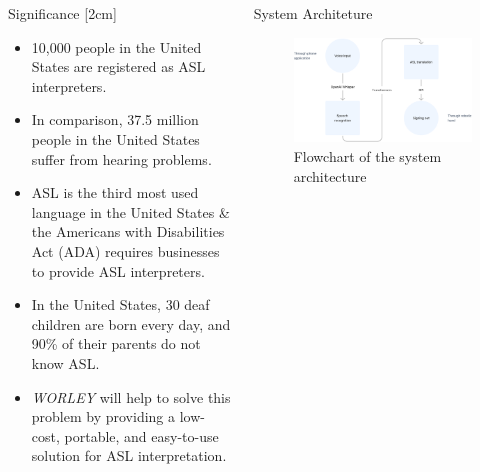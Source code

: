 \documentclass[final, 20pt]{beamer}
\newlength{\colwidth}
\begin{document}
\begin{frame}[t]
\begin{columns}[t]
\begin{column}{\colwidth}
\begin{block}{Significance}
        [2cm]

        \begin{itemize}
          \item 10,000 people in the United States are registered as ASL interpreters.
          \item In comparison, 37.5 million people in the United States suffer from hearing problems.
          \item ASL is the third most used language in the United States \& the Americans with Disabilities Act (ADA) requires businesses to provide ASL interpreters.
          \item In the United States, 30 deaf children are born every day, and 90\% of their parents do not know ASL.
          \item \emph{WORLEY} will help to solve this problem by providing a low-cost, portable, and easy-to-use solution for ASL interpretation.
        \end{itemize}
      \end{block}
    \end{column}

    \separatorcolumn

    \begin{column}{\colwidth}
      \begin{block}{System Architeture}
        \begin{figure}[ht]
          \centering
          \includegraphics[width=0.8\linewidth]{images/flowchart.png}
          \caption{Flowchart of the system architecture}
          \label{fig:flowchart}
        \end{figure}


\end{block}
\end{column}
\end{columns}
\end{frame}
\end{document}
